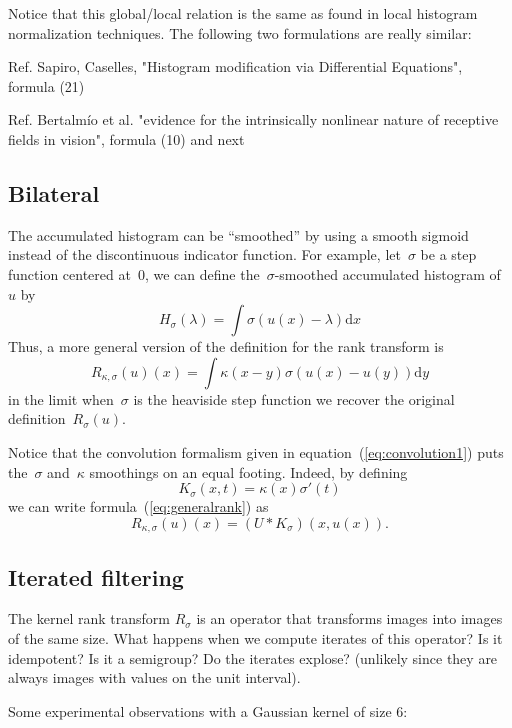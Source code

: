 \documentclass[12pt]{article}                  %
\begin{document}
Notice that this global/local relation is the same as found in local
histogram normalization techniques.
The following two formulations are really similar:

Ref. Sapiro, Caselles,  "Histogram modification via Differential Equations",
formula (21)

Ref. Bertalmío et al. "evidence for the intrinsically nonlinear nature of
receptive fields in vision", formula (10) and next



\subsection{Bilateral}
The accumulated histogram can be ``smoothed'' by using a smooth sigmoid instead
of the discontinuous indicator function.  For example, let~$\sigma$ be a step
function centered at~$0$, we can define the~$\sigma$-smoothed accumulated
histogram of~$u$ by
\[
H_\sigma(\lambda)=\int\sigma(u(x)-\lambda)\mathrm{d}x
\]
Thus, a more general version of the definition for the rank transform is
\begin{equation}\label{eq:generalrank}
R_{\kappa,\sigma}(u)(x)=\int \kappa(x-y)\sigma(u(x)-u(y))\mathrm{d}y
\end{equation}
in the limit when~$\sigma$ is the heaviside step function we recover the
original definition~$R_\sigma(u)$.

Notice that the convolution formalism given in
equation~(\ref{eq:convolution1}) puts the~$\sigma$ and~$\kappa$ smoothings
on an equal footing.  Indeed, by defining
\[
	K_\sigma(x,t)=\kappa(x)\sigma'(t)
\]
we can write formula~(\ref{eq:generalrank}) as
\begin{equation}\label{eq:convolution2}
	R_{\kappa,\sigma}(u)(x)=(U*K_\sigma)(x,u(x)).
\end{equation}

\subsection{Iterated filtering}

The kernel rank transform $R_\sigma$ is an operator that transforms images into images of the same size.
What happens when we compute iterates of this operator?   Is it idempotent?  Is it a semigroup?  Do the iterates explose? (unlikely since they are always images with values on the unit interval).

Some experimental observations with a Gaussian kernel of size
6:
\end{document}
